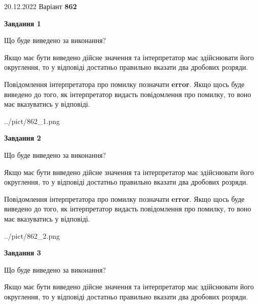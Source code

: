 \documentclass[12pt, ukrainian]{article}
\begin{document}
{20.12.2022 Варіант \No \textbf { 862 }\par}
{
\begin {Large}

{\begin {center}\textbf{Завдання 1}\end {center}}\par
Що буде виведено за виконання? \par

Якщо має бути виведено дійсне значення та інтерпретатор має здійснювати його округлення, 
то у відповіді достатньо правильно вказати два дробових розряди.

Повідомлення інтерпретатора про помилку позначати \textbf{error}.
Якщо щось буде виведено до того, як інтерпретатор видасть повідомлення про помилку, 
то воно має вказуватись у відповіді. \par

\begin{center}
	{../pict/862_1.png}
\end{center}
\newpage

{\begin {center}\textbf{Завдання 2}\end {center}}\par
Що буде виведено за виконання? \par

Якщо має бути виведено дійсне значення та інтерпретатор має здійснювати його округлення, 
то у відповіді достатньо правильно вказати два дробових розряди.

Повідомлення інтерпретатора про помилку позначати \textbf{error}.
Якщо щось буде виведено до того, як інтерпретатор видасть повідомлення про помилку, 
то воно має вказуватись у відповіді. \par

\begin{center}
	{../pict/862_2.png}
\end{center}
\newpage

{\begin {center}\textbf{Завдання 3}\end {center}}\par
Що буде виведено за виконання? \par

Якщо має бути виведено дійсне значення та інтерпретатор має здійснювати його округлення, 
то у відповіді достатньо правильно вказати два дробових розряди.


\end{Large}}
\end{document}
